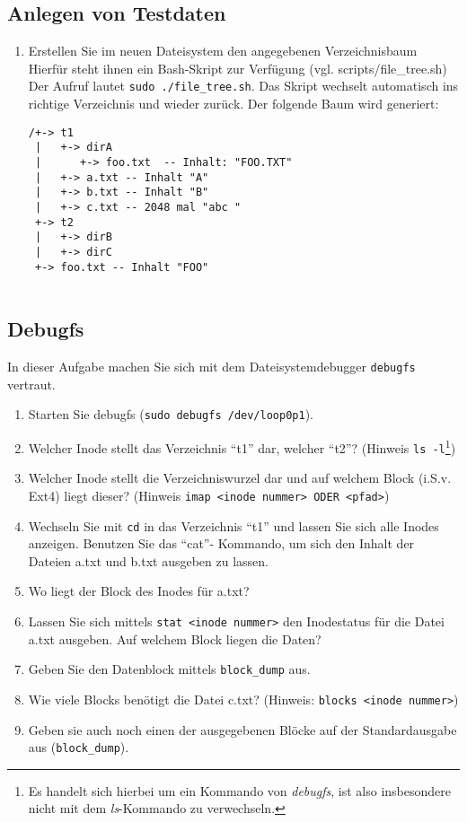 \documentclass[11pt,a4paper]{article}
\def\inlinebash{\lstinline[style=bash]}
\begin{document}
\subsection{Anlegen von Testdaten}

\begin{enumerate}
\item Erstellen Sie im neuen Dateisystem den angegebenen Verzeichnisbaum 
	Hierfür steht ihnen ein Bash-Skript zur Verfügung (vgl. scripts/file\_tree.sh)
	Der Aufruf lautet \inlinebash$sudo ./file_tree.sh$. Das Skript wechselt automatisch
	ins richtige Verzeichnis und wieder zurück. Der folgende Baum wird generiert:

\begin{verbatim}
/+-> t1
 |   +-> dirA
 |      +-> foo.txt  -- Inhalt: "FOO.TXT"
 |   +-> a.txt -- Inhalt "A"
 |   +-> b.txt -- Inhalt "B" 
 |   +-> c.txt -- 2048 mal "abc "
 +-> t2
 |   +-> dirB
 |   +-> dirC
 +-> foo.txt -- Inhalt "FOO"
 
\end{verbatim}
\end{enumerate}

\subsection{Debugfs}
In dieser Aufgabe machen Sie sich mit dem Dateisystemdebugger
\inlinebash$debugfs$ vertraut.

\begin{enumerate}
	\item Starten Sie debugfs (\inlinebash$sudo debugfs /dev/loop0p1$).
	\item Welcher Inode stellt das Verzeichnis ``t1'' dar, welcher ``t2''?
		(Hinweis \inlinebash$ls -l$\footnote{
			Es handelt sich hierbei um ein Kommando von \emph{debugfs}, ist also
			insbesondere nicht mit dem \emph{ls}-Kommando zu verwechseln.})
	\item Welcher Inode stellt die Verzeichniswurzel dar und
		auf welchem Block (i.S.v. Ext4) liegt dieser?
		(Hinweis \inlinebash$imap <inode nummer> ODER <pfad>$)
	\item Wechseln Sie mit \inlinebash$cd$ in das Verzeichnis ``t1'' und lassen
		Sie sich alle Inodes anzeigen. Benutzen Sie das ``cat''-
		Kommando, um sich den Inhalt der Dateien a.txt und b.txt
		ausgeben zu lassen.
	\item Wo liegt der Block des Inodes für a.txt?
	\item Lassen Sie sich mittels \inlinebash$stat <inode nummer>$ den
		Inodestatus für die Datei a.txt ausgeben.
		Auf welchem Block liegen die Daten?
	\item Geben Sie den Datenblock mittels \inlinebash$block_dump$ aus.
	\item Wie viele Blocks benötigt die Datei c.txt?
		(Hinweis: \inlinebash$blocks <inode nummer>$)
	\item Geben sie auch noch einen der ausgegebenen Blöcke
		auf der Standardausgabe aus (\inlinebash$block_dump$).
\end{enumerate}
\end{document}
